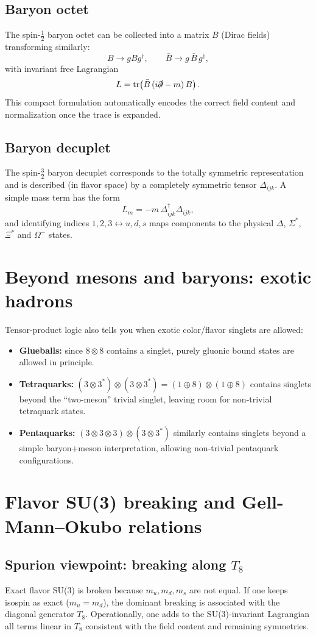 \subsection{Baryon octet}
The spin-$\tfrac12$ baryon octet can be collected into a matrix $B$ (Dirac fields) transforming similarly:
\[
B\to gBg^\dagger,\qquad \bar B \to g\,\bar B\,g^\dagger,
\]
with invariant free Lagrangian
\[
L=\mathrm{tr}\!\left(\bar B\,(i\slashed{\partial}-m)\,B\right).
\]
This compact formulation automatically encodes the correct field content and normalization once the trace is expanded.

\subsection{Baryon decuplet}
The spin-$\tfrac32$ baryon decuplet corresponds to the totally symmetric representation and is described (in flavor space) by a completely symmetric tensor $\Delta_{ijk}$. A simple mass term has the form
\[
L_m=-m\,\Delta^\dagger_{ijk}\Delta_{ijk},
\]
and identifying indices $1,2,3\leftrightarrow u,d,s$ maps components to the physical $\Delta$, $\Sigma^*$, $\Xi^*$ and $\Omega^-$ states.

\section{Beyond mesons and baryons: exotic hadrons}
Tensor-product logic also tells you when exotic color/flavor singlets are allowed:
\begin{itemize}
  \item \textbf{Glueballs:} since $8\otimes 8$ contains a singlet, purely gluonic bound states are allowed in principle.
  \item \textbf{Tetraquarks:} $(3\otimes 3^*)\otimes(3\otimes 3^*)=(1\oplus 8)\otimes(1\oplus 8)$ contains singlets beyond the ``two-meson'' trivial singlet, leaving room for non-trivial tetraquark states.
  \item \textbf{Pentaquarks:} $(3\otimes 3\otimes 3)\otimes(3\otimes 3^*)$ similarly contains singlets beyond a simple baryon+meson interpretation, allowing non-trivial pentaquark configurations.
\end{itemize}

\section{Flavor SU(3) breaking and Gell-Mann--Okubo relations}
\subsection{Spurion viewpoint: breaking along $T_8$}
Exact flavor SU(3) is broken because $m_u,m_d,m_s$ are not equal. If one keeps isospin as exact ($m_u=m_d$), the dominant breaking is associated with the diagonal generator $T_8$. Operationally, one adds to the SU(3)-invariant Lagrangian all terms linear in $T_8$ consistent with the field content and remaining symmetries.

